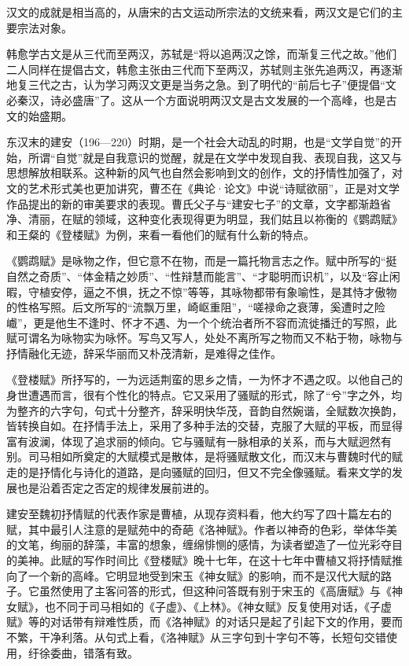 汉文的成就是相当高的，从唐宋的古文运动所宗法的文统来看，两汉文是它们的主要宗法对象。

韩愈学古文是从三代而至两汉，苏轼是“将以追两汉之馀，而渐复三代之故。”他们二人同样在提倡古文，韩愈主张由三代而下至两汉，苏轼则主张先追两汉，再逐渐地复三代之古，认为学习两汉文更是当务之急。到了明代的“前后七子”便提倡“文必秦汉，诗必盛唐”了。这从一个方面说明两汉文是古文发展的一个高峰，也是古文的始盛期。

东汉末的建安（196—220）时期，是一个社会大动乱的时期，也是“文学自觉”的开始，所谓“自觉”就是自我意识的觉醒，就是在文学中发现自我、表现自我，这又与思想解放相联系。这种新的风气也自然会影响到文的创作，文的抒情性加强了，对文的艺术形式美也更加讲究，曹丕在《典论·论文》中说“诗赋欲丽”，正是对文学作品提出的新的审美要求的表现。曹氏父子与“建安七子”的文章，文字都渐趋省净、清丽，在赋的领域，这种变化表现得更为明显，我们姑且以祢衡的《鹦鹉赋》和王粲的《登楼赋》为例，来看一看他们的赋有什么新的特点。

《鹦鹉赋》是咏物之作，但它意不在物，而是一篇托物言志之作。赋中所写的“挺自然之奇质”、“体金精之妙质”、“性辩慧而能言”、“才聪明而识机”，以及“容止闲暇，守植安停，逼之不惧，抚之不惊”等等，其咏物都带有象喻性，是其恃才傲物的性格写照。后文所写的“流飘万里，崎岖重阻”，“嗟禄命之衰薄，奚遭时之险巇”，更是他生不逢时、怀才不遇、为一个个统治者所不容而流徙播迁的写照，此赋可谓名为咏物实为咏怀。写鸟又写人，处处不离所写之物而又不粘于物，咏物与抒情融化无迹，辞采华丽而又朴茂清新，是难得之佳作。

《登楼赋》所抒写的，一为远适荆蛮的思乡之情，一为怀才不遇之叹。以他自己的身世遭遇而言，很有个性化的特点。它又采用了骚赋的形式，除了“兮”字之外，均为整齐的六字句，句式十分整齐，辞采明快华茂，音韵自然婉谐，全赋数次换韵，皆转换自如。在抒情手法上，采用了多种手法的交替，克服了大赋的平板，而显得富有波澜，体现了追求丽的倾向。它与骚赋有一脉相承的关系，而与大赋迥然有别。司马相如所奠定的大赋模式是散体，是将骚赋散文化，而汉末与曹魏时代的赋走的是抒情化与诗化的道路，是向骚赋的回归，但又不完全像骚赋。看来文学的发展也是沿着否定之否定的规律发展前进的。

建安至魏初抒情赋的代表作家是曹植，从现存资料看，他大约写了四十篇左右的赋，其中最引人注意的是赋苑中的奇葩《洛神赋》。作者以神奇的色彩，举体华美的文笔，绚丽的辞藻，丰富的想象，缠绵悱恻的感情，为读者塑造了一位光彩夺目的美神。此赋的写作时间比《登楼赋》晚十七年，在这十七年中曹植又将抒情赋推向了一个新的高峰。它明显地受到宋玉《神女赋》的影响，而不是汉代大赋的路子。它虽然使用了主客问答的形式，但这种问答既有别于宋玉的《高唐赋》与《神女赋》，也不同于司马相如的《子虚》、《上林》。《神女赋》反复使用对话，《子虚赋》等的对话带有辩难性质，而《洛神赋》的对话只是起了引起下文的作用，要而不繁，干净利落。从句式上看，《洛神赋》从三字句到十字句不等，长短句交错使用，纡徐委曲，错落有致。

